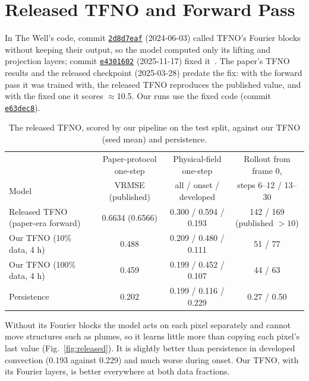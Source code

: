 \documentclass[11pt]{article}
\begin{document}
\section{Released TFNO and Forward Pass}
\label{app:tfno}
In The Well's code, commit
\href{https://github.com/PolymathicAI/the_well/commit/2d8d7eaf9eb46b96f215abf39c94b6be4bf9ea5c}{\texttt{2d8d7eaf}}
(2024-06-03) called TFNO's Fourier blocks without keeping their output, so the model computed only its lifting and
projection layers; commit
\href{https://github.com/PolymathicAI/the_well/commit/e4301602e57f2dddeaa87856dda49bbba47c663b}{\texttt{e4301602}}
(2025-11-17) fixed it~\cite{wellfix}. The paper's TFNO results and the released checkpoint (2025-03-28) predate the
fix: with the forward pass it was trained with, the released TFNO reproduces the published value, and with the fixed
one it scores $\approx$10.5. Our runs use the fixed code (commit
\href{https://github.com/PolymathicAI/the_well/commit/e63dec8ded515be864755eaf595d39fea409e335}{\texttt{e63dec8}}).

\begin{table}[!htbp]
\centering\footnotesize
\begin{tabular}{@{}lccc@{}}
\toprule
& Paper-protocol one-step & Physical-field one-step & Rollout from frame 0, \\
Model & VRMSE (published) & all / onset / developed & steps 6--12 / 13--30 \\
\midrule
Released TFNO (paper-era forward) & 0.6634 (0.6566) & 0.300 / 0.594 / 0.193 & 142 / 169 (published $>10$) \\
Our TFNO (10\% data, 4 h) & 0.488 & 0.209 / 0.480 / 0.111 & 51 / 77 \\
Our TFNO (100\% data, 4 h) & 0.459 & 0.199 / 0.452 / 0.107 & 44 / 63 \\
Persistence & 0.202 & 0.199 / 0.116 / 0.229 & 0.27 / 0.50 \\
\bottomrule
\end{tabular}
\caption{The released TFNO, scored by our pipeline on the test split, against our TFNO (seed mean) and
persistence.}
\label{tab:released_tfno}
\end{table}

Without its Fourier blocks the model acts on each pixel separately and cannot move structures such as plumes, so it
learns little more than copying each pixel's last value (Fig.~\ref{fig:released}). It is slightly better than
persistence in developed convection (0.193 against 0.229) and much worse during onset. Our TFNO, with its Fourier
layers, is better everywhere at both data fractions.
\end{document}
